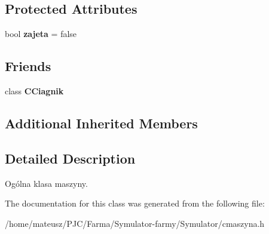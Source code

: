 \subsection*{Protected Attributes}
\begin{DoxyCompactItemize}
\item 
\mbox{\label{class_c_maszyna_a5a1517d5d260975a4c213a922f400c30}} 
bool {\bfseries zajeta} = false
\end{DoxyCompactItemize}
\subsection*{Friends}
\begin{DoxyCompactItemize}
\item 
\mbox{\label{class_c_maszyna_af779b811b92e8b85e0d1340c2345c7d0}} 
class {\bfseries C\+Ciagnik}
\end{DoxyCompactItemize}
\subsection*{Additional Inherited Members}


\subsection{Detailed Description}
Ogólna klasa maszyny. 



The documentation for this class was generated from the following file\+:\begin{DoxyCompactItemize}
\item 
/home/mateusz/\+P\+J\+C/\+Farma/\+Symulator-\/farmy/\+Symulator/cmaszyna.\+h\end{DoxyCompactItemize}
